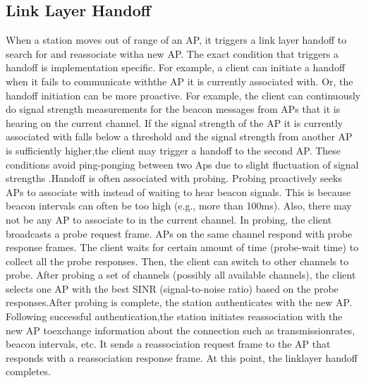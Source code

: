 \documentclass[12pt,a4paper]{report}
\begin{document}
\subsection{Link Layer Handoff}
When a station moves out of range of an AP, it triggers a link layer handoff to search for and reassociate witha new AP. The exact condition that triggers a handoff is implementation specific. For example, a client can initiate a handoff when it fails to communicate withthe AP it is currently associated with. Or, the handoff initiation can be more proactive. For example, the client can continuously do signal strength measurements for the beacon messages from APs that it is hearing on the current channel. If the signal strength of the AP it is currently associated with falls below a threshold and the signal strength from another AP is sufficiently higher,the client may trigger a handoff to the second AP. These conditions avoid ping-ponging between two Aps due to slight fluctuation of signal strengths .Handoff is often associated with probing. Probing proactively seeks APs to associate with instead of waiting to hear beacon signals. This is because beacon intervals can often be too high (e.g., more than 100ms). Also, there may not be any AP to associate to in the current channel. In probing, the client broadcasts a probe request frame. APs on the same channel respond with probe response frames. The client waits for certain amount of time (probe-wait time) to collect all the probe responses. Then, the client can switch to other channels to probe. After probing a set of channels (possibly all available channels), the client selects one AP with the best SINR (signal-to-noise ratio) based on the probe responses.After probing is complete, the station authenticates with the new AP. Following successful authentication,the station initiates reassociation with the new AP toexchange information about the connection such as transmissionrates, beacon intervals, etc. It sends a reassociation request frame to the AP that responds with a reassociation response frame. At this point, the linklayer handoff completes.
\end{document}
